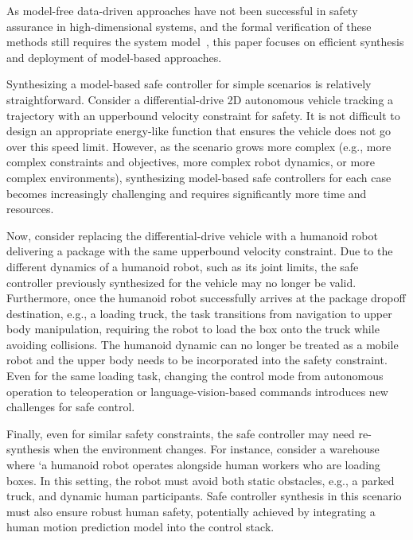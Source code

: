 As model-free data-driven approaches have not been successful in safety assurance in high-dimensional systems, and the formal verification of these methods still requires the system model~\cite{fulton2018safe}, 
this paper focuses on efficient synthesis and deployment of model-based approaches. 

Synthesizing a model-based safe controller for simple scenarios is relatively straightforward.
Consider a differential-drive 2D autonomous vehicle tracking a trajectory with an upperbound velocity constraint for safety. 
It is not difficult to design an appropriate energy-like function that ensures the vehicle does not go over this speed limit.
However, as the scenario grows more complex (e.g., more complex constraints and objectives,  more complex robot dynamics, or more complex environments), synthesizing model-based safe controllers for each case becomes increasingly challenging and requires significantly more time and resources.

Now, consider replacing the differential-drive vehicle with a humanoid robot delivering a package with the same upperbound velocity constraint.
Due to the different dynamics of a humanoid robot, such as its joint limits, the safe controller previously synthesized for the vehicle may no longer be valid.
Furthermore, once the humanoid robot successfully arrives at the package dropoff destination, e.g., a loading truck, the task transitions from navigation to upper body manipulation, requiring the robot to load the box onto the truck while avoiding collisions.
The humanoid dynamic can no longer be treated as a mobile robot and the upper body needs to be incorporated into the safety constraint.
Even for the same loading task, changing the control mode from autonomous operation to teleoperation or language-vision-based commands introduces new challenges for safe control.

Finally, even for similar safety constraints, the safe controller may need re-synthesis when the environment changes. 
For instance, consider a warehouse where `a humanoid robot operates alongside human workers who are loading boxes. In this setting, the robot must avoid both static obstacles, e.g., a parked truck, and dynamic human participants.
Safe controller synthesis in this scenario must also ensure robust human safety, potentially achieved by integrating a human motion prediction model into the control stack.

